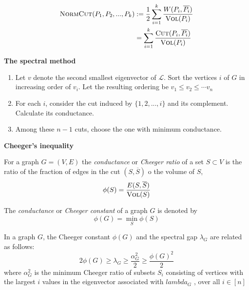 \begin{align*}
	\textsc{NormCut}(P_1, P_2, ..., P_k) & := \frac{1}{2} \sum_{i=1}^k \frac{W(P_i, \overline{P_i})}{\textsc{Vol}(P_i)}\\
	&= \sum_{i=1}^k \frac{\textsc{Cut}(P_i, \overline{P_i})}{\textsc{Vol}(P_i)}
\end{align*}

\textbf{The spectral method}
\begin{enumerate}
	\item Let $v$ denote the second smallest eigenvector of $\mathcal{L}$. Sort the vertices $i$ of $G$ in increasing order of $v_i$. Let the resulting ordering be $v_1 \leq v_2 \leq \cdots v_n$
	\item For each $i$, consider the cut induced by $\{1,2,..., i\}$ and its complement. Calculate its conductance.
	\item Among these $n-1$ cuts, choose the one with minimum conductance.
\end{enumerate}

\textbf{Cheeger's inequality}

For a graph $G=(V,E)$ the \textit{conductance} or \textit{Cheeger ratio} of a set $S\subset V$ is the ratio of the fraction of edges in the cut $(S,\overline{S})$ o the volume of $S$,
\begin{displaymath}
	\phi(S) = \frac{E(S,\overline{S})}{\textsc{Vol}(S)}
\end{displaymath}

The \textit{conductance} or \textit{Cheeger constant} of a graph $G$ is denoted by 
\begin{displaymath}
	\phi(G) = \min_S \phi(S)
\end{displaymath}

\begin{theorem}
	In a graph $G$, the Cheeger constant $\phi(G)$ and the spectral gap $\lambda_G$ are related as follows:
	\begin{displaymath}
		2\phi(G)\geq \lambda_G \geq \frac{\alpha_G^2}{2} \geq \frac{\phi(G)^2}{2} 
	\end{displaymath}
	where $\alpha_G^2$ is the minimum Cheeger ratio of subsets $S_i$ consisting of vertices with the largest $i$ values in the eigenvector associated with $lambda_G$ , over all $i\in[n]$
\end{theorem}

